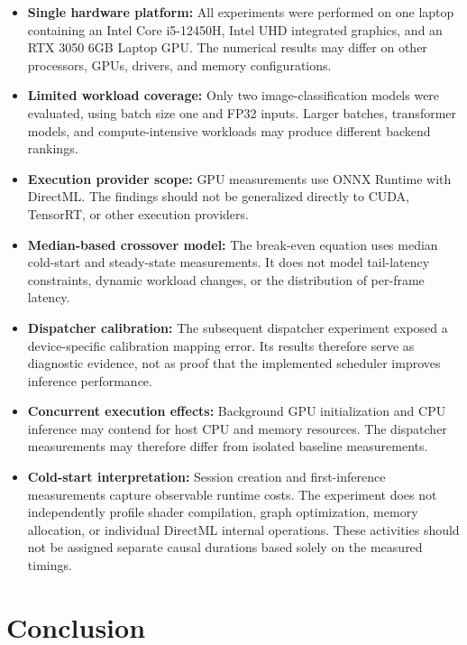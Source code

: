 \documentclass[pdflatex,sn-mathphys-num]{sn-jnl}
\begin{document}
\begin{itemize}
    \item \textbf{Single hardware platform:} All experiments were performed on one laptop containing an Intel Core i5-12450H, Intel UHD integrated graphics, and an RTX 3050 6GB Laptop GPU. The numerical results may differ on other processors, GPUs, drivers, and memory configurations.

    \item \textbf{Limited workload coverage:} Only two image-classification models were evaluated, using batch size one and FP32 inputs. Larger batches, transformer models, and compute-intensive workloads may produce different backend rankings.

    \item \textbf{Execution provider scope:} GPU measurements use ONNX Runtime with DirectML. The findings should not be generalized directly to CUDA, TensorRT, or other execution providers.

    \item \textbf{Median-based crossover model:} The break-even equation uses median cold-start and steady-state measurements. It does not model tail-latency constraints, dynamic workload changes, or the distribution of per-frame latency.

    \item \textbf{Dispatcher calibration:} The subsequent dispatcher experiment exposed a device-specific calibration mapping error. Its results therefore serve as diagnostic evidence, not as proof that the implemented scheduler improves inference performance.

    \item \textbf{Concurrent execution effects:} Background GPU initialization and CPU inference may contend for host CPU and memory resources. The dispatcher measurements may therefore differ from isolated baseline measurements.

    \item \textbf{Cold-start interpretation:} Session creation and first-inference measurements capture observable runtime costs. The experiment does not independently profile shader compilation, graph optimization, memory allocation, or individual DirectML internal operations. These activities should not be assigned separate causal durations based solely on the measured timings.
\end{itemize}

\section{Conclusion}
\end{document}
